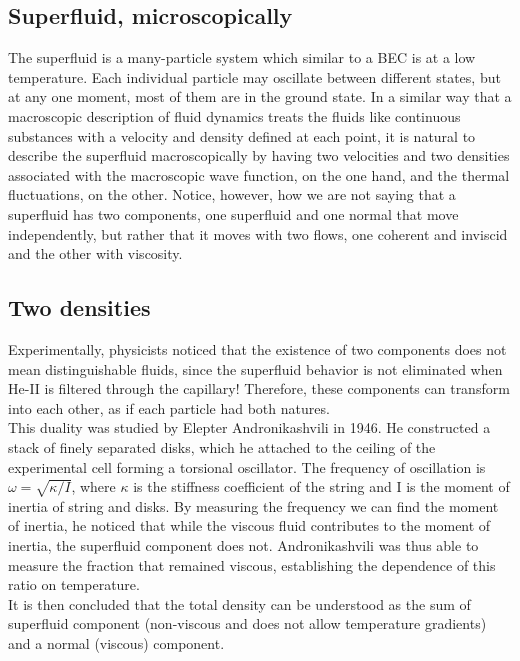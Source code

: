 \documentclass{article}
\begin{document}
\subsection{Superfluid, microscopically}

The superfluid is a many-particle system which similar to a BEC is at a low temperature.  Each individual particle may oscillate between different states, but at any one moment, most of them are in the ground state.  In a similar way that a macroscopic description of fluid dynamics treats the fluids like continuous substances with a velocity and density defined at each point, it is natural to describe the superfluid macroscopically by having two velocities and two densities associated with the macroscopic wave function, on the one hand, and the thermal fluctuations, on the other.  Notice, however, how we are not saying that a superfluid has two components, one superfluid and one normal that move independently, but rather that it moves with two flows, one coherent and inviscid and the other with viscosity.

\subsection{Two densities}

Experimentally, physicists noticed that the existence of two components does not mean distinguishable fluids, since the superfluid behavior is not eliminated when He-II is filtered through the capillary! Therefore, these components can transform into each other, as if each particle had both natures. 
\\

This duality was studied by Elepter Andronikashvili in 1946. He constructed a stack of finely separated disks, which he attached to the ceiling of the experimental cell forming a torsional oscillator. The frequency of oscillation is $\omega = \sqrt{\kappa/I}$, where $\kappa$ is the stiffness coefficient of the string and I is the moment of inertia of string and disks. By measuring the frequency we can find the moment of inertia, he noticed that while the viscous fluid contributes to the moment of inertia, the superfluid component does not. Andronikashvili was thus able to measure the fraction that remained viscous, establishing the dependence of this ratio on temperature.
\\

It is then concluded that the total density can be understood as the sum of superfluid component (non-viscous and does not allow temperature gradients) and a normal (viscous) component.
\end{document}
